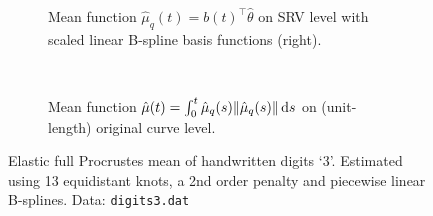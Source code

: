 \begin{figure}[t]
  \centering
  \begin{subfigure}{\textwidth}
    \begin{subfigure}{.48\textwidth}
      \centering
    \end{subfigure}\hfill%
    \begin{subfigure}{.48\textwidth}
      \centering
      \begin{subfigure}{\textwidth}
        \centering
      \end{subfigure}
      \begin{subfigure}{\textwidth}
        \centering
      \end{subfigure}
    \end{subfigure}
    \caption{Mean function $\hat\mu_q(t) = b(t)^\top \hat\theta$ on SRV level with scaled linear B-spline basis functions (right).}
  \end{subfigure}\vspace{0.66em}\\
  \begin{subfigure}{\textwidth}
    \centering
    \begin{subfigure}{.48\textwidth}
      \centering
    \end{subfigure}\hfill%
    \begin{subfigure}{.48\textwidth}
      \centering
      \begin{subfigure}{\textwidth}
        \centering
      \end{subfigure}
      \begin{subfigure}{\textwidth}
        \centering
      \end{subfigure}
    \end{subfigure}
    \caption{Mean function $\hat\mu(t) = \int_0^t \hat\mu_q(s) \lVert\hat\mu_q(s)\rVert \mathop{\mathrm{d}s}$ on (unit-length) original curve level.}
  \end{subfigure}
  \caption{Elastic full Procrustes mean of handwritten digits \enquote*{3}.
    Estimated using 13 equidistant knots, a 2nd order penalty and piecewise linear B-splines.
    Data: \texttt{digits3.dat}}
  \label{fig:3-mean}
\end{figure}


